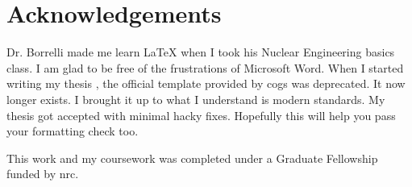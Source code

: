    \chapter{Acknowledgements}
   Dr. Borrelli made me learn \LaTeX\; when I took his Nuclear Engineering basics class. I am glad to be free of the frustrations of Microsoft Word. When I started writing my thesis \cite{RootMS}, the official template provided by \acs{cogs} was deprecated. It now longer exists. I brought it up to what I understand is modern standards. My thesis got accepted with minimal hacky fixes. Hopefully this will help you pass your formatting check too.

     This work and my coursework was completed under a Graduate Fellowship funded by \acf{nrc}.